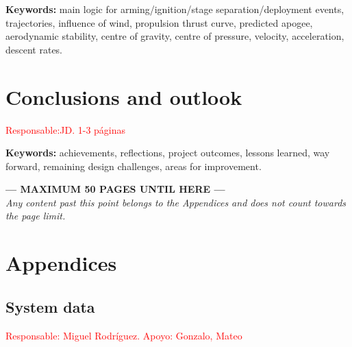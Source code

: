 \documentclass[11pt, a4paper]{article} %
\begin{document}
\vspace{0.5cm}
\noindent\textbf{Keywords:} main logic for arming/ignition/stage separation/deployment events, trajectories, influence of wind, propulsion thrust curve, predicted apogee, aerodynamic stability, centre of gravity, centre of pressure, velocity, acceleration, descent rates.

\section{Conclusions and outlook} \textcolor{red}{Responsable:JD. 1-3 páginas}

\vspace{0.5cm}
\noindent\textbf{Keywords:} achievements, reflections, project outcomes, lessons learned, way forward, remaining design challenges, areas for improvement.

\newpage
\vspace*{5cm}
\begin{center}
    \Huge \textbf{\textcolor{EtseNavy}{--- MAXIMUM 50 PAGES UNTIL HERE ---}} \\
    \vspace{1cm}
    \Large \textit{Any content past this point belongs to the Appendices and does not count towards the page limit.}
\end{center}
\newpage

\section{Appendices}

\subsection{System data} \textcolor{red}{Responsable: Miguel Rodríguez. Apoyo: Gonzalo, Mateo}
\end{document}
